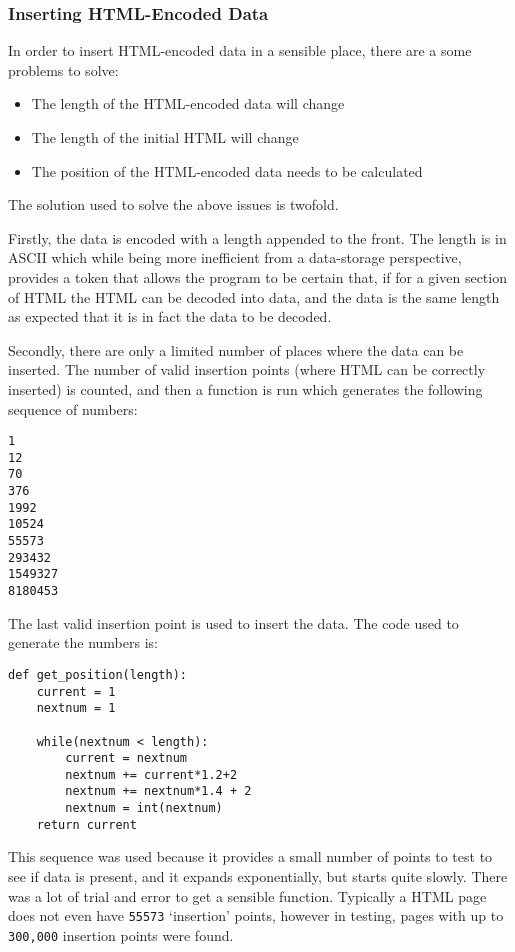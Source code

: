 \subsubsection{Inserting HTML-Encoded Data}
In order to insert HTML-encoded data in a sensible place, there are a some problems to solve:
\begin{itemize}
    \item The length of the HTML-encoded data will change
    \item The length of the initial HTML will change
    \item The position of the HTML-encoded data needs to be calculated
\end{itemize}

The solution used to solve the above issues is twofold.\par
Firstly, the data is encoded with a length appended to the front.
The length is in ASCII which while being more inefficient from a data-storage perspective, provides a token that allows the program to be certain that, if for a given section of HTML the HTML can be decoded into data, and the data is the same length as expected that it is in fact the data to be decoded.\par
Secondly, there are only a limited number of places where the data can be inserted. The number of valid insertion points (where HTML can be correctly inserted) is counted, and then a function is run which generates the following sequence of numbers:
\begin{lstlisting}
1
12
70
376
1992
10524
55573
293432
1549327
8180453
\end{lstlisting}
The last valid insertion point is used to insert the data.
The code used to generate the numbers is:
\begin{lstlisting}
def get_position(length):
    current = 1
    nextnum = 1

    while(nextnum < length):
        current = nextnum
        nextnum += current*1.2+2
        nextnum += nextnum*1.4 + 2
        nextnum = int(nextnum)
    return current
\end{lstlisting}
This sequence was used because it provides a small number of points to test to see if data is present, and it expands exponentially, but starts quite slowly. There was a lot of trial and error to get a sensible function.
Typically a HTML page does not even have \texttt{55573} `insertion' points, however in testing, pages with up to \texttt{300,000} insertion points were found.\par

